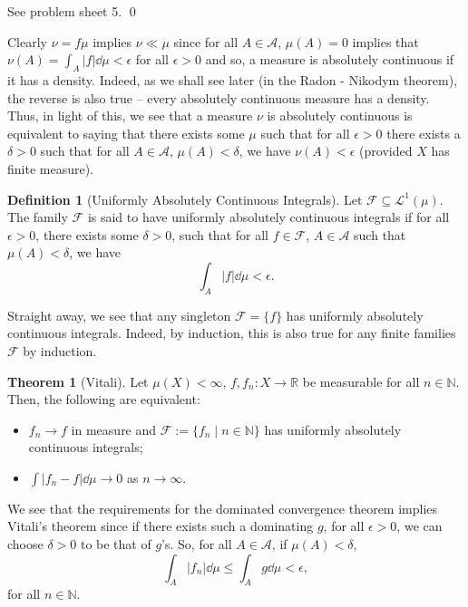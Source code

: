 \documentclass[
]{article}
\theoremstyle{definition}
\newtheorem{theorem}{Theorem}
\theoremstyle{definition}
\newtheorem{definition}{Definition}[section]
\begin{document}
See problem sheet 5. \qed

Clearly \(\nu = f\mu\) implies \(\nu \ll \mu\) since for all
\(A \in \mathcal{A}\), \(\mu(A) = 0\) implies that
\(\nu (A) = \int_A |f| \dd \mu < \epsilon\) for all \(\epsilon > 0\) and
so, a measure is absolutely continuous if it has a density. Indeed, as
we shall see later (in the Radon - Nikodym theorem), the reverse is also
true -- every absolutely continuous measure has a density. Thus, in
light of this, we see that a measure \(\nu\) is absolutely continuous is
equivalent to saying that there exists some \(\mu\) such that for all
\(\epsilon > 0\) there exists a \(\delta > 0\) such that for all
\(A \in \mathcal{A}\), \(\mu(A) < \delta\), we have
\(\nu(A) < \epsilon\) (provided \(X\) has finite measure).

\begin{definition}[Uniformly Absolutely Continuous Integrals]
  Let \(\mathcal{F} \subseteq \mathcal{L}^1(\mu)\). The family \(\mathcal{F}\) is 
  said to have uniformly absolutely continuous integrals if for all \(\epsilon > 0\), 
  there exists some \(\delta > 0\), such that for all \(f \in \mathcal{F}\), 
  \(A \in \mathcal{A}\) such that \(\mu(A) < \delta\), we have 
  \[\int_A |f| \dd \mu < \epsilon.\]
\end{definition}

Straight away, we see that any singleton \(\mathcal{F} = \{f\}\) has
uniformly absolutely continuous integrals. Indeed, by induction, this is
also true for any finite families \(\mathcal{F}\) by induction.

\begin{theorem}[Vitali]
  Let \(\mu(X) < \infty\), \(f, f_n : X \to \mathbb{R}\) be measurable for all 
  \(n \in \mathbb{N}\). Then, the following are equivalent:
  \begin{itemize}
    \item \(f_n \to f\) in measure and \(\mathcal{F} := \{f_n \mid n \in \mathbb{N}\}\) 
      has uniformly absolutely continuous integrals;
    \item \(\int |f_n - f| \dd \mu \to 0\) as \(n \to \infty\).
  \end{itemize}
\end{theorem}

We see that the requirements for the dominated convergence theorem
implies Vitali's theorem since if there exists such a dominating \(g\),
for all \(\epsilon > 0\), we can choose \(\delta > 0\) to be that of
\(g\)'s. So, for all \(A \in \mathcal{A}\), if \(\mu(A) < \delta\),
\[\int_A |f_n| \dd \mu \le \int_A g \dd \mu < \epsilon,\] for all
\(n \in \mathbb{N}\).
\end{document}
